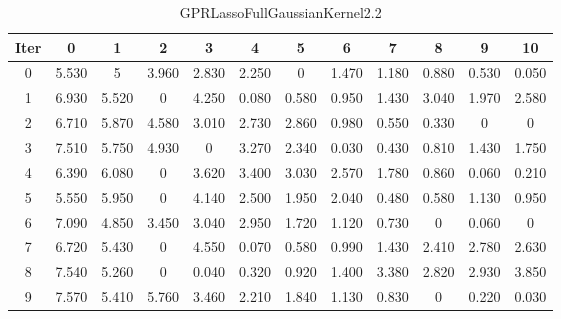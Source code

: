 \begin{table}
	\begin{center}
		\begin{tabular}{|c|c|c|c|c|c|c|c|c|c|c|c|}
			\hline
			Iter & 0 & 1 & 2 & 3 & 4 & 5 & 6 & 7 & 8 & 9 & 10 \\
			\hline
			0 & 5.530 & 5 & 3.960 & 2.830 & 2.250 & 0 & 1.470 & 1.180 & 0.880 & 0.530 & 0.050 \\
			\hline
			1 & 6.930 & 5.520 & 0 & 4.250 & 0.080 & 0.580 & 0.950 & 1.430 & 3.040 & 1.970 & 2.580 \\
			\hline
			2 & 6.710 & 5.870 & 4.580 & 3.010 & 2.730 & 2.860 & 0.980 & 0.550 & 0.330 & 0 & 0 \\
			\hline
			3 & 7.510 & 5.750 & 4.930 & 0 & 3.270 & 2.340 & 0.030 & 0.430 & 0.810 & 1.430 & 1.750 \\
			\hline
			4 & 6.390 & 6.080 & 0 & 3.620 & 3.400 & 3.030 & 2.570 & 1.780 & 0.860 & 0.060 & 0.210 \\
			\hline
			5 & 5.550 & 5.950 & 0 & 4.140 & 2.500 & 1.950 & 2.040 & 0.480 & 0.580 & 1.130 & 0.950 \\
			\hline
			6 & 7.090 & 4.850 & 3.450 & 3.040 & 2.950 & 1.720 & 1.120 & 0.730 & 0 & 0.060 & 0 \\
			\hline
			7 & 6.720 & 5.430 & 0 & 4.550 & 0.070 & 0.580 & 0.990 & 1.430 & 2.410 & 2.780 & 2.630 \\
			\hline
			8 & 7.540 & 5.260 & 0 & 0.040 & 0.320 & 0.920 & 1.400 & 3.380 & 2.820 & 2.930 & 3.850 \\
			\hline
			9 & 7.570 & 5.410 & 5.760 & 3.460 & 2.210 & 1.840 & 1.130 & 0.830 & 0 & 0.220 & 0.030 \\
			\hline
		\end{tabular}
	\end{center}
	\caption{GPRLassoFullGaussianKernel2.2}
\end{table}